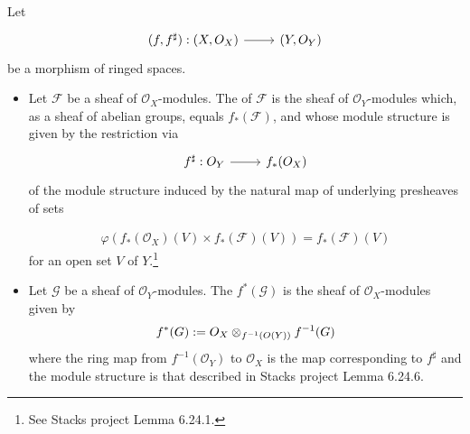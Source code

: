 \documentclass [11 pt, oneside] {article}
\begin{document}
\begin{definition}\label{}\text{}
Let
\[
\begin{tikzcd}
	(f,f^{\sharp}) : (X,\mathscr{O}_{X}) \ar[r]& (Y,\mathscr{O}_{Y})
\end{tikzcd}
\]
be a morphism of ringed spaces. 
\begin{itemize}
	\item Let $\mathscr{F}$ be a sheaf of $\mathscr{O}_{X}$-modules. The  of $\mathscr{F}$ is the sheaf of $\mathscr{O}_{Y}$-modules which, as a sheaf of abelian groups, equals $f_{*}(\mathscr{F})$, and whose module structure is given by the restriction via 
		\[
		\begin{tikzcd}
			f^{\sharp} : \mathscr{O}_{Y}\ar[r] & f_{*}(\mathscr{O}_{X})
		\end{tikzcd}
		\]
		of the module structure induced by the natural map of underlying presheaves of sets

		\begin{align*}
			\varphi(f_{*}(\mathscr{O}_{X}) (V) \times f _{*}(\mathscr{F}) (V)) = f_{*}(\mathscr{F}) (V)
		\end{align*}
		for an open set $V$ of $Y$.\footnote{See Stacks project Lemma 6.24.1.}
	\item Let $\mathscr{G}$ be a sheaf of $\mathscr{O}_{Y}$-modules. The  $f^{*}(\mathscr{G})$ is the sheaf of $\mathscr{O}_{X}$-modules given by
		\begin{align*}
			f^{*}(\relax{G}) := \relax{O}_{X} \otimes_{f^{-1}(\relax{O}(Y))} f^{-1}(\relax{G})
		\end{align*}
		where the ring map from $f^{-1}(\mathscr{O}_{Y})$ to $\mathscr{O}_{X}$ is the map corresponding to $f^{\sharp}$ and the module structure is that described in Stacks project Lemma 6.24.6.
\end{itemize}
\end{definition}
\end{document}
